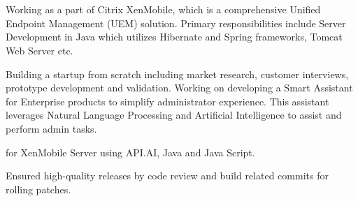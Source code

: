\documentclass[]{deedy-resume-openfont}
\begin{document}
\begin{minipage}[t]{0.48\textwidth} 


\section{}
\hline
\vspace{2mm}
\vspace{\topsep} %
\vspace{2mm}
\begin{tightemize}
\item Working as a part of Citrix XenMobile, which is a comprehensive Unified Endpoint Management (UEM) solution. Primary responsibilities include Server Development in Java which utilizes Hibernate and Spring frameworks, Tomcat Web Server etc.
\vspace{1mm}
\item {}Building a startup from scratch including market research, customer interviews, prototype development and validation. Working on developing a Smart Assistant for Enterprise products to simplify administrator experience. This assistant leverages Natural Language Processing and Artificial Intelligence to assist and perform admin tasks.
\vspace{1mm}
\item {} for XenMobile Server using API.AI, Java and Java Script.
\vspace{1mm}
\item {} Ensured high-quality releases by code review and build related commits for rolling patches.
\vspace{1mm}


\end{tightemize}
\end{minipage}
\end{document}
